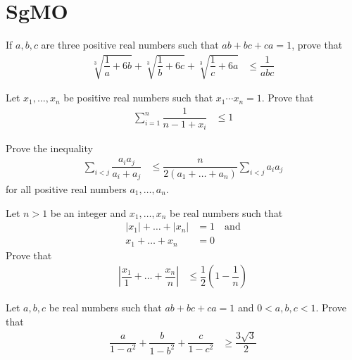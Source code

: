 \documentclass{subfile}
\begin{document}
	
	\section{SgMO}\label{sec:sgmo}
	
		\begin{problem}
			If $a,b,c$ are three positive real numbers such that $ab+bc+ca=1$, prove that
				\begin{align*}
					\sqrt[3]{\dfrac{1}{a}+6b}+\sqrt[3]{\dfrac{1}{b}+6c}+\sqrt[3]{\dfrac{1}{c}+6a}
						& \leq\dfrac{1}{abc}
				\end{align*}
		\end{problem}
		
		\begin{problem}
			Let $x_{1},\ldots,x_{n}$ be positive real numbers such that $x_{1}\cdots x_{n}=1$. Prove that
				\begin{align*}
					\sum_{i=1}^{n}\dfrac{1}{n-1+x_{i}}
						& \leq1
				\end{align*}
		\end{problem}
		
		\begin{problem}
			Prove the inequality
				\begin{align*}
					\sum_{i<j}\dfrac{a_{i}a_{j}}{a_{i}+a_{j}}
						& \leq \dfrac{n}{2(a_{1}+\ldots+a_{n})}\sum_{i<j}a_{i}a_{j}
				\end{align*}
			for all positive real numbers $a_{1},\ldots,a_{n}$.
		\end{problem}
		
		\begin{problem}
			Let $n>1$ be an integer and $x_{1},\ldots,x_{n}$ be real numbers such that
				\begin{align*}
					|x_{1}|+\ldots+|x_{n}|
						& = 1\quad\mbox{and}\\
					x_{1}+\ldots+x_{n}
						& = 0
				\end{align*}
			Prove that
				\begin{align*}
					\left|\dfrac{x_{1}}{1}+\ldots+\dfrac{x_{n}}{n}\right|
						& \leq \dfrac{1}{2}\left(1-\dfrac{1}{n}\right)
				\end{align*}
		\end{problem}
		
		\begin{problem}
			Let $a,b,c$ be real numbers such that $ab+bc+ca=1$ and $0<a,b,c<1$. Prove that
				\begin{align*}
					\dfrac{a}{1-a^{2}}+\dfrac{b}{1-b^{2}}+\dfrac{c}{1-c^{2}}
						& \geq\dfrac{3\sqrt{3}}{2}
				\end{align*}
		\end{problem}
\end{document}
